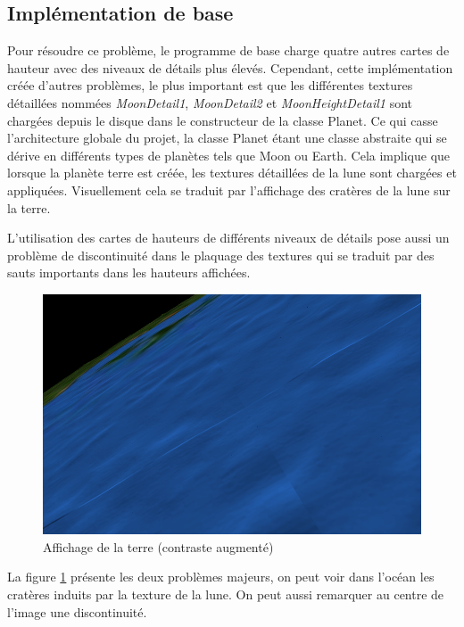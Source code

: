     \subsection{Implémentation de base}
    Pour résoudre ce problème, le programme de base charge quatre autres cartes de hauteur avec des niveaux de détails plus élevés. Cependant, cette implémentation créée d'autres problèmes, le plus important est que les différentes textures détaillées nommées \textit{MoonDetail1}, \textit{MoonDetail2} et \textit{MoonHeightDetail1} sont chargées depuis le disque dans le constructeur de la classe Planet. Ce qui casse l'architecture globale du projet, la classe Planet étant une classe abstraite qui se dérive en différents types de planètes tels que Moon ou Earth.
    Cela implique que lorsque la planète terre est créée, les textures détaillées de la lune sont chargées et appliquées.
    Visuellement cela se traduit par l'affichage des cratères de la lune sur la terre.

    L'utilisation des cartes de hauteurs de différents niveaux de détails pose aussi un problème de discontinuité dans le plaquage des textures qui se traduit par des sauts importants dans les hauteurs affichées.\\
     
    \begin{figure}
        \centering
        \includegraphics[width=12cm]{img/earth2.png}
        \caption{Affichage de la terre (contraste augmenté)}
        \label{fig:earth}
    \end{figure}
    
    
    La figure \ref{fig:earth} présente les deux problèmes majeurs, on peut voir dans l'océan les cratères induits par la texture de la lune. On peut aussi remarquer au centre de l'image une discontinuité.\\
    
